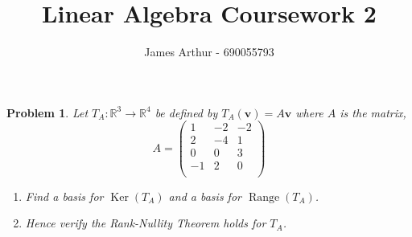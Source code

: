 \documentclass{article}
\title{Linear Algebra Coursework 2}
\author{James Arthur - 690055793}
\renewcommand{\ker}{\operatorname{Ker}}
\newcommand{\range}{\operatorname{Range}}
\newcommand{\R}{\mathbb{R}}
\renewcommand{\vec}[1]{\boldsymbol{\mathbf{#1}}}
\newtheorem{problem}{Problem}
\begin{document}
\maketitle

\begin{problem}
  Let $T_A : \R^3 \to \R^4$ be defined by $T_A(\vec v) = A\vec v$ where $A$ is the matrix,
  $$A = \begin{pmatrix}
      1 & -2 & -2\\
      2 & -4 & 1\\
      0 & 0 & 3 \\
      -1 & 2 & 0 \\
    \end{pmatrix}$$
  \begin{enumerate}
    \item Find a basis for $\ker(T_A)$ and a basis for $\range(T_A)$.
    \item Hence verify the Rank-Nullity Theorem holds for $T_A$.
  \end{enumerate}
\end{problem}
\end{document}
